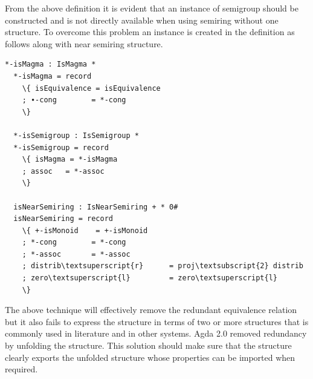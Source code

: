 From the above definition it is evident that an instance of semigroup should be constructed and is not directly available when using semiring without one structure. To overcome this problem an instance is created in the definition as follows along with near semiring structure. \\
\begin{Verbatim}[commandchars=\\\{\}]
  *-isMagma : IsMagma *
  *-isMagma = record
    \{ isEquivalence = isEquivalence
    ; ∙-cong        = *-cong
    \}

  *-isSemigroup : IsSemigroup *
  *-isSemigroup = record
    \{ isMagma = *-isMagma
    ; assoc   = *-assoc
    \}

  isNearSemiring : IsNearSemiring + * 0#
  isNearSemiring = record
    \{ +-isMonoid    = +-isMonoid
    ; *-cong        = *-cong
    ; *-assoc       = *-assoc
    ; distrib\textsuperscript{r}      = proj\textsubscript{2} distrib
    ; zero\textsuperscript{l}         = zero\textsuperscript{l}
    \}
\end{Verbatim}
The above technique will effectively remove the redundant equivalence relation but it also fails to express the structure in terms of two or more structures that is commonly used in literature and in other systems. Agda 2.0 removed redundancy by unfolding the structure. This solution should make sure that the structure clearly exports the unfolded structure whose properties can be imported when required.

